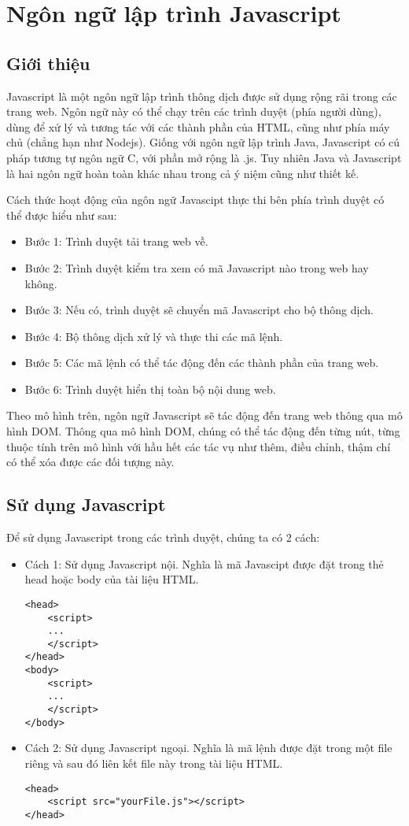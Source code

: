 \section{Ngôn ngữ lập trình Javascript}
\subsection{Giới thiệu}
Javascript là một ngôn ngữ lập trình thông dịch được sử dụng rộng rãi trong các trang web. Ngôn ngữ này có thể chạy trên các trình duyệt (phía người dùng), dùng để xử lý và tương tác với các thành phần của HTML, cũng như phía máy chủ (chẳng hạn như Nodejs). Giống với ngôn ngữ lập trình Java, Javascript có cú pháp tương tự ngôn ngữ C, với phần mở rộng là .js. Tuy nhiên Java và Javascript là hai ngôn ngữ hoàn toàn khác nhau trong cả ý niệm cũng như thiết kế. 

Cách thức hoạt động của ngôn ngữ Javascipt thực thi bên phía trình duyệt có thể được hiểu như sau:
\begin{itemize}
\item 	Bước 1: Trình duyệt tải trang web về.
\item 	Bước 2: Trình duyệt kiểm tra xem có mã Javascript nào trong web hay không.
\item 	Bước 3: Nếu có, trình duyệt sẽ chuyển mã Javascript cho bộ thông dịch.
\item 	Bước 4: Bộ thông dịch xử lý và thực thi các mã lệnh.
\item 	Bước 5: Các mã lệnh có thể tác động đến các thành phần của trang web.
\item 	Bước 6: Trình duyệt hiển thị toàn bộ nội dung web.
\end{itemize}

Theo mô hình trên, ngôn ngữ Javascript sẽ tác động đến trang web thông qua mô hình DOM. Thông qua mô hình DOM, chúng có thể tác động đến từng nút, từng thuộc tính trên mô hình với hầu hết các tác vụ như thêm, điều chỉnh, thậm chí có thể xóa được các đối tượng này.
\subsection{Sử dụng Javascript}
Để sử dụng Javascript trong các trình duyệt, chúng ta có 2 cách:
\begin{itemize}


\item 	Cách 1: Sử dụng Javascript nội. Nghĩa là mã Javascipt được đặt trong thẻ head hoặc body của tài liệu HTML.
\lstset{language=XML}
\begin{lstlisting}[escapechar=`]
<head>
	<script>
	...
	</script>
</head>
<body>
	<script>
	...
	</script>
</body>
\end{lstlisting}
\item 	Cách 2: Sử dụng Javascript ngoại. Nghĩa là mã lệnh được đặt trong một file riêng và sau đó liên kết file này trong tài liệu HTML.
\lstset{language=XML}
\begin{lstlisting}[escapechar=`]
<head>
	<script src="yourFile.js"></script>
</head>
\end{lstlisting}
\end{itemize}
